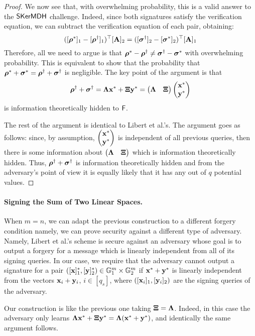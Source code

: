 \begin{proof}
We now see that, with overwhelming probability, this is a valid answer to the $\mathsf{SKerMDH}$ challenge.
Indeed, since both signatures satisfy the verification equation, we can subtract the verification equation of each pair, obtaining:
\begin{equation*}
([{\boldsymbol \rho}^{*}]_1-[{\boldsymbol \rho}^{\dagger}]_1)^{\top} [\mathbf{{A}}]_2=  ([{\boldsymbol \sigma}^{\dagger}]_2-[{\boldsymbol \sigma}^{*}]_2)^{\top} [\mathbf{{A}}]_1
\end{equation*}
Therefore, all we need to argue is that ${\boldsymbol \rho}^{*}-{\boldsymbol \rho}^{\dagger} \neq {\boldsymbol \sigma}^{\dagger}-{\boldsymbol \sigma}^{*}$
with overwhelming probability. This is equivalent to show that  the probability that ${\boldsymbol \rho}^{*}+{\boldsymbol \sigma}^{*} = 
{\boldsymbol \rho}^{\dagger}+ {\boldsymbol \sigma}^{\dagger}$ is negligible.  
The key point of the argument is that 
 \begin{equation*}
 {\boldsymbol \rho}^{\dagger}+ {\boldsymbol \sigma}^{\dagger}=\mathbf{{\Lambda}}\mathbf{x}^*+\mathbf{{\Xi}}\mathbf{y}^*= 
  \begin{pmatrix}  
 {\mathbf{{\Lambda}}} & {\mathbf{{\Xi}}}
 \end{pmatrix}
 \begin{pmatrix}\mathbf{x}^*\\ \mathbf{y}^* \end{pmatrix}
  \end{equation*}
is information theoretically hidden to $\mathsf{F}$. 

The rest of the argument is identical to Libert et al.'s. The argument goes as follows: since, by assumption, $\begin{pmatrix}\mathbf{x}^*\\ \mathbf{y}^* \end{pmatrix}$ is independent of all  previous queries, then  there is some information about $\begin{pmatrix}  
 {\mathbf{{\Lambda}}} & {\mathbf{{\Xi}}}
 \end{pmatrix}$ 
which is information theoretically hidden. Thus,  ${\boldsymbol \rho}^{\dagger}+ {\boldsymbol \sigma}^{\dagger}$ is information theoretically hidden and from the adversary's point of view it is equally likely that it has any out of $q$ potential values.  
\end{proof}

\paragraph{Signing the Sum of Two Linear Spaces.} \label{sec:newhom} When $m=n$, we can adapt the previous construction to a different forgery condition namely, we 
can prove security against a different type of adversary. Namely, Libert et al.'s scheme is secure against an adversary whose goal is to output a forgery for a message which is linearly independent from all of its signing queries. In our case, we require that the adversary cannot output a signature for a pair
$([\mathbf{x}]_1^*,[\mathbf{y}]_2^*) \in \mathbb{G}_1^{m} \times \mathbb{G}_2^{m}$ if $\mathbf{x}^*+\mathbf{y}^*$ is
linearly independent from the 
vectors $\mathbf{x}_i+\mathbf{y}_i$, $i \in [q_s]$, where $([\mathbf{x}_i]_1,[\mathbf{y}_i]_2)$ are the signing queries of the adversary. 

Our construction is like the previous one taking $\mathbf{{\Xi}}=\mathbf{{\Lambda}}$. Indeed, in this case the adversary only learns $\mathbf{{\Lambda}} \mathbf{x}^*+ \mathbf{{\Xi}} \mathbf{y}^*=\mathbf{{\Lambda}} (\mathbf{x}^*+\mathbf{y}^*)$, and identically the same argument follows. 
